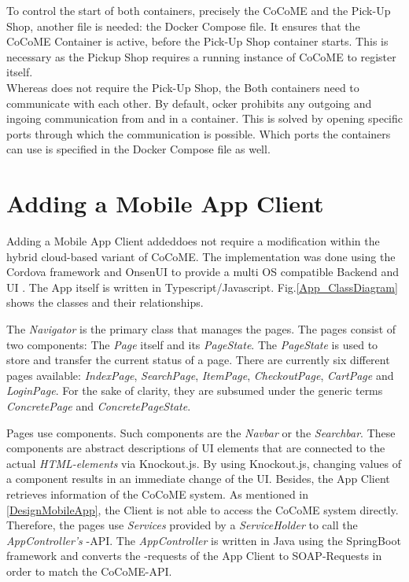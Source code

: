  \noindent
To control the start of both containers, precisely the CoCoME and the Pick-Up Shop, another  file is needed: the Docker Compose file. 
It ensures that the CoCoME Container is active, before the Pick-Up Shop container starts. 
This is necessary as the Pickup Shop requires a running instance of CoCoME to register itself.\\
Whereas \CoCoME does not require the Pick-Up Shop, the 
Both containers need to communicate with each other. 
By default, ocker prohibits any outgoing and ingoing communication from and in a container. 
This is solved by opening specific ports through which the communication is possible. 
Which ports the containers can use is specified in the Docker Compose file as well.
 	
 	
\section{Adding a Mobile App Client}\label{AppImplementation}
Adding a Mobile App Client added{does} not require a modification within the hybrid cloud-based variant of CoCoME. 
The implementation was done using the Cordova framework and OnsenUI to provide a multi OS compatible Backend and UI \cite{schnabel}. 
The App itself is written in Typescript/Javascript. 
Fig.\added{~}\ref{App_ClassDiagram} shows the  classes and their relationships.

The \textit{Navigator} is the primary class that manages the pages. 
The pages consist of two components: The \textit{Page} itself and its \textit{PageState}. 
The \textit{PageState} is used to store and transfer the current status of a page. 
There are currently six different pages available: \textit{IndexPage}, \textit{SearchPage}, \textit{ItemPage}, \textit{CheckoutPage}, \textit{CartPage} and \textit{LoginPage}. 
For the sake of clarity, they are subsumed under the generic terms \textit{ConcretePage} and \textit{ConcretePageState}. 

Pages use components. 
Such components are  the \textit{Navbar} or the \textit{Searchbar}. 
These components are abstract descriptions of UI elements that are connected to the actual \textit{HTML-elements} via Knockout.js. 
By using Knockout.js, changing values of a component results in an immediate change of the UI. 
Besides, the App Client retrieves information of the CoCoME system.  
As mentioned in \ref{DesignMobileApp}, the Client is not able to access the CoCoME system directly. 
Therefore, the pages use \textit{Services} provided by a \textit{ServiceHolder} to call the \textit{AppController's} -API. 
The \textit{AppController} is written in Java using the SpringBoot framework and converts the -requests of the App Client to SOAP-Requests in order to match the CoCoME-API. 
  
